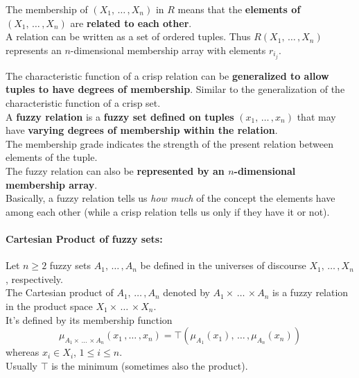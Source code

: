 The membership of $(X_1, \, \dots \, , X_n)$ in $R$ means that the \textbf{elements of} $(X_1, \, \dots \, ,X_n)$ are \textbf{related to each other}.\\

A relation can be written as a set of ordered tuples. Thus $R (X_1, \, \dots \, , X_n)$ represents an $n$-dimensional membership array with elements $r_{i_j}$.\\

\newpage

The characteristic function of a crisp relation can be \textbf{generalized to allow tuples to have degrees of membership}. Similar to the generalization of the characteristic function of a crisp set. \\

A \textbf{fuzzy relation} is a \textbf{fuzzy set defined on tuples} $(x_1, \, \dots \, , x_n)$ that may have \textbf{varying degrees of membership within the relation}. \\
The membership grade indicates the strength of the present relation between elements of the tuple. \\

The fuzzy relation can also be \textbf{represented by an $n$-dimensional membership array}. \\

Basically, a fuzzy relation tells us \textit{how much} of the concept the elements have among each other (while a crisp relation tells us only if they have it or not).\\

\paragraph{Cartesian Product of fuzzy sets:} Let $n \geq 2$ fuzzy sets $A_1, \, \dots \, , A_n$ be defined in the universes of discourse $X_1, \, \dots \, , X_n$, respectively.\\
The Cartesian product of $A_1, \, \dots \, , A_n$ denoted by $A_1 \times \, \dots \, \times A_n$ is a fuzzy relation in the product space $X_1 \times \, \dots \, \times X_n$.\\

It's defined by its membership function 
$$ \mu_{A_1 \times \, \dots \, \times A_n} (x_1 \, , \dots \, , x_n) = \top (\mu_{A_1} (x_1), \, \dots \, , \mu_{A_n} (x_n))$$
whereas $x_i \in X_i$, $1 \leq i \leq n$.\\

Usually $\top$ is the minimum (sometimes also the product).\\

